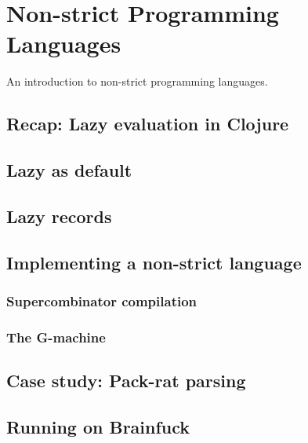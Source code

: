\chapter{Non-strict Programming Languages}

An introduction to non-strict programming languages.

\section{Recap: Lazy evaluation in Clojure}

\section{Lazy as default}

\section{Lazy records}

\section{Implementing a non-strict language}

\subsection{Supercombinator compilation}

\subsection{The G-machine}

\section{Case study: Pack-rat parsing}

\section{Running on Brainfuck}

